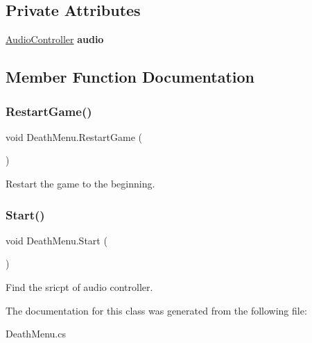 \subsection*{Private Attributes}
\begin{DoxyCompactItemize}
\item 
\hypertarget{class_death_menu_abb68f7fae08e62bb9234a0870810f9cd}{}\label{class_death_menu_abb68f7fae08e62bb9234a0870810f9cd} 
\hyperlink{class_audio_controller}{Audio\+Controller} {\bfseries audio}
\end{DoxyCompactItemize}


\subsection{Member Function Documentation}
\hypertarget{class_death_menu_a331f0bc408bd7621fe89bb0950c40997}{}\label{class_death_menu_a331f0bc408bd7621fe89bb0950c40997} 
\subsubsection{\texorpdfstring{Restart\+Game()}{RestartGame()}}
{\footnotesize\ttfamily void Death\+Menu.\+Restart\+Game (\begin{DoxyParamCaption}{ }\end{DoxyParamCaption})}



Restart the game to the beginning. 

\hypertarget{class_death_menu_a635010b99915f887ed7809f5c2e2a655}{}\label{class_death_menu_a635010b99915f887ed7809f5c2e2a655} 
\subsubsection{\texorpdfstring{Start()}{Start()}}
{\footnotesize\ttfamily void Death\+Menu.\+Start (\begin{DoxyParamCaption}{ }\end{DoxyParamCaption})\hspace{0.3cm}{\ttfamily [private]}}



Find the sricpt of audio controller. 



The documentation for this class was generated from the following file\+:\begin{DoxyCompactItemize}
\item 
Death\+Menu.\+cs\end{DoxyCompactItemize}

